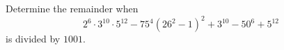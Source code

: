 Determine the remainder when $$2^6\cdot3^{10}\cdot5^{12}-75^4\left(26^2-1\right)^2+3^{10}-50^6+5^{12}$$ is divided by $1001$.